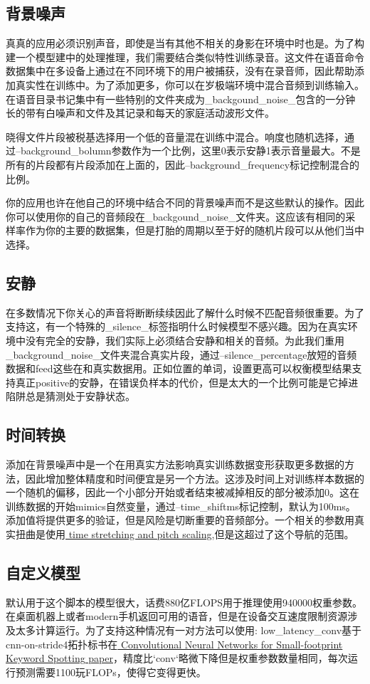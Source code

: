 {\subsection{背景噪声}
真真的应用必须识别声音，即使是当有其他不相关的身影在环境中时也是。为了构建一个模型建中的处理推理，我们需要结合类似特性训练录音。这文件在语音命令数据集中在多设备上通过在不同环境下的用户被捕获，没有在录音师，因此帮助添加真实性在训练中。为了添加更多，你可以在岁极端环境中混合音频到训练输入。在语音目录书记集中有一些特别的文件夹成为\_backgound\_noise\_包含的一分钟长的带有白噪声和文件及其记录和每天的家庭活动波形文件。

晓得文件片段被税基选择用一个低的音量混在训练中混合。响度也随机选择，通过--background\_bolumn参数作为一个比例，这里0表示安静1表示音量最大。不是所有的片段都有片段添加在上面的，因此--background\_frequency标记控制混合的比例。

你的应用也许在他自己的环境中结合不同的背景噪声而不是这些默认的操作。因此你可以使用你的自己的音频段在\_backgound\_noise\_文件夹。这应该有相同的采样率作为你的主要的数据集，但是打胎的周期以至于好的随机片段可以从他们当中选择。

\subsection{安静}
在多数情况下你关心的声音将断断续续因此了解什么时候不匹配音频很重要。为了支持这，有一个特殊的\_silence\_标签指明什么时候模型不感兴趣。因为在真实环境中没有完全的安静，我们实际上必须结合安静和相关的音频。为此我们重用\_background\_noise\_文件夹混合真实片段，通过--silence\_percentage放短的音频数据和feed这些在和真实数据用。正如位置的单词，设置更高可以权衡模型结果支持真正positive的安静，在错误负样本的代价，但是太大的一个比例可能是它掉进陷阱总是猜测处于安静状态。
\subsection{时间转换}
添加在背景噪声中是一个在用真实方法影响真实训练数据变形获取更多数据的方法，因此增加整体精度和时间便宜是另一个方法。这涉及时间上对训练样本数据的一个随机的偏移，因此一个小部分开始或者结束被减掉相反的部分被添加0。这在训练数据的开始mimics自然变量，通过--time\_shift\)ms标记控制，默认为100ms。添加值将提供更多的验证，但是风险是切断重要的音频部分。一个相关的参数用真实扭曲是使用\href{https://en.wikipedia.org/wiki/Audio_time_stretching_and_pitch_scaling}{ time stretching and pitch scaling},但是这超过了这个导航的范围。
\subsection{自定义模型}
默认用于这个脚本的模型很大，话费880亿FLOPS用于推理使用940000权重参数。在桌面机器上或者modern手机返回可用的语音，但是在设备交互速度限制资源涉及太多计算运行。为了支持这种情况有一对方法可以使用:
low\_latency\_conv基于cnn-on-stride4拓扑标书在\href{http://www.isca-speech.org/archive/interspeech_2015/papers/i15_1478.pdf}{ Convolutional Neural Networks for Small-footprint Keyword Spotting paper}，精度比`conv`略微下降但是权重参数数量相同，每次运行预测需要1100玩FLOPs，使得它变得更快。

}
